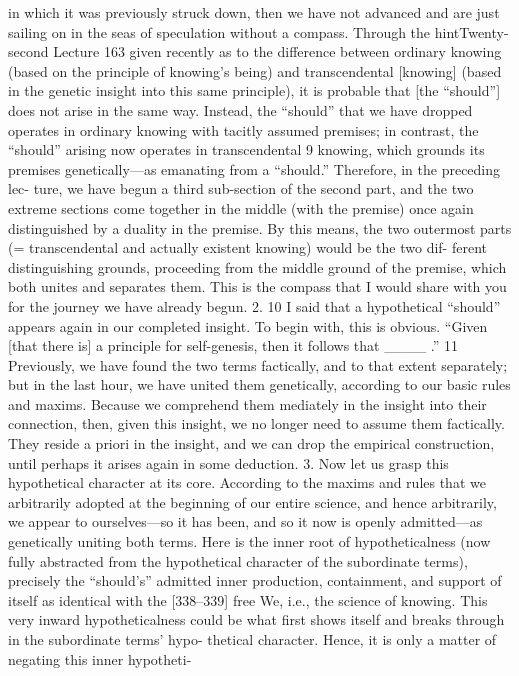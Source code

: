 in which it was previously struck down, then we have not advanced and are
just sailing on in the seas of speculation without a compass. Through the hintTwenty-second Lecture
163
given recently as to the difference between ordinary knowing (based on the
principle of knowing’s being) and transcendental [knowing] (based in the
genetic insight into this same principle), it is probable that [the “should”] does
not arise in the same way. Instead, the “should” that we have dropped operates
in ordinary knowing with tacitly assumed premises; in contrast, the “should”
arising now operates in transcendental 9 knowing, which grounds its premises
genetically—as emanating from a “should.” Therefore, in the preceding lec-
ture, we have begun a third sub-section of the second part, and the two
extreme sections come together in the middle (with the premise) once again
distinguished by a duality in the premise. By this means, the two outermost
parts (= transcendental and actually existent knowing) would be the two dif-
ferent distinguishing grounds, proceeding from the middle ground of the
premise, which both unites and separates them. This is the compass that I
would share with you for the journey we have already begun.
2. 10 I said that a hypothetical “should” appears again in our completed
insight. To begin with, this is obvious. “Given [that there is] a principle for
self-genesis, then it follows that ____ .” 11 Previously, we have found the two
terms factically, and to that extent separately; but in the last hour, we have
united them genetically, according to our basic rules and maxims. Because we
comprehend them mediately in the insight into their connection, then, given
this insight, we no longer need to assume them factically. They reside a priori
in the insight, and we can drop the empirical construction, until perhaps it
arises again in some deduction.
3. Now let us grasp this hypothetical character at its core. According to
the maxims and rules that we arbitrarily adopted at the beginning of our entire
science, and hence arbitrarily, we appear to ourselves—so it has been, and so
it now is openly admitted—as genetically uniting both terms. Here is the
inner root of hypotheticalness (now fully abstracted from the hypothetical
character of the subordinate terms), precisely the “should’s” admitted inner
production, containment, and support of itself as identical with the [338–339]
free We, i.e., the science of knowing. This very inward hypotheticalness could
be what first shows itself and breaks through in the subordinate terms’ hypo-
thetical character. Hence, it is only a matter of negating this inner hypotheti-
